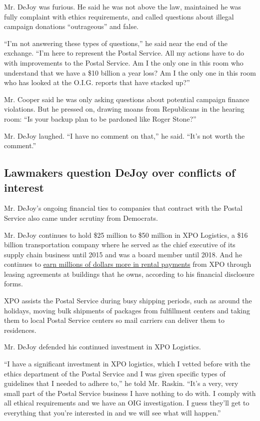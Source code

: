 Mr. DeJoy was furious. He said he was not above the law, maintained he
was fully complaint with ethics requirements, and called questions about
illegal campaign donations ``outrageous'' and false.

``I'm not answering these types of questions,'' he said near the end of
the exchange. ``I'm here to represent the Postal Service. All my actions
have to do with improvements to the Postal Service. Am I the only one in
this room who understand that we have a \$10 billion a year loss? Am I
the only one in this room who has looked at the O.I.G. reports that have
stacked up?''

Mr. Cooper said he was only asking questions about potential campaign
finance violations. But he pressed on, drawing moans from Republicans in
the hearing room: ``Is your backup plan to be pardoned like Roger
Stone?''

Mr. DeJoy laughed. ``I have no comment on that,'' he said. ``It's not
worth the comment.''

\hypertarget{lawmakers-question-dejoy-over-conflicts-of-interest}{%
\subsection{Lawmakers question DeJoy over conflicts of
interest}\label{lawmakers-question-dejoy-over-conflicts-of-interest}}

Mr. DeJoy's ongoing financial ties to companies that contract with the
Postal Service also came under scrutiny from Democrats.

Mr. DeJoy continues to hold \$25 million to \$50 million in XPO
Logistics, a \$16 billion transportation company where he served as the
chief executive of its supply chain business until 2015 and was a board
member until 2018. And he continues to
\href{https://www.nytimes3xbfgragh.onion/2020/08/17/us/politics/dejoy-postal-service-mail-in-voting.html}{earn
millions of dollars more in rental payments} from XPO through leasing
agreements at buildings that he owns, according to his financial
disclosure forms.

XPO assists the Postal Service during busy shipping periods, such as
around the holidays, moving bulk shipments of packages from fulfillment
centers and taking them to local Postal Service centers so mail carriers
can deliver them to residences.

Mr. DeJoy defended his continued investment in XPO Logistics.

``I have a significant investment in XPO logistics, which I vetted
before with the ethics department of the Postal Service and I was given
specific types of guidelines that I needed to adhere to,'' he told Mr.
Raskin. ``It's a very, very small part of the Postal Service business I
have nothing to do with. I comply with all ethical requirements and we
have an OIG investigation. I guess they'll get to everything that you're
interested in and we will see what will happen.''

